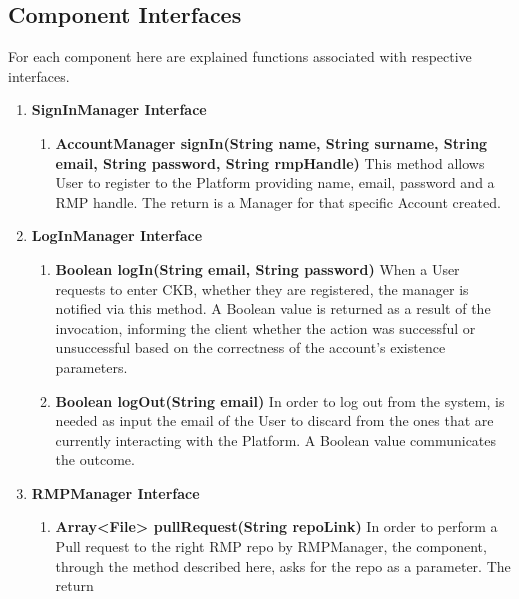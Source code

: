 \subsection{Component Interfaces}
For each component here are explained functions associated with respective interfaces.
\begin{enumerate}
    \item \textbf{SignInManager Interface} 
            \begin{enumerate}[label=$\bullet$]
                \item \textbf{AccountManager signIn(String name, String surname, String email, String password, String rmpHandle)} This method allows User to register to the Platform providing name, email, password and a RMP handle. 
                The return is a Manager for that specific Account created.
            \end{enumerate}
    \item \textbf{LogInManager Interface}
        \begin{enumerate}[label=$\bullet$]
            \item \textbf{Boolean logIn(String email, String password)} When a User requests to enter CKB, whether they are registered, the manager is notified via this method. A Boolean value is returned as a result of the 
            invocation, informing the client whether the action was successful or unsuccessful based on the correctness of the account's existence parameters.
            \item \textbf{Boolean logOut(String email)} In order to log out from the system, is needed as input the email of the User to discard from the ones that are currently interacting with the Platform. A Boolean value communicates 
            the outcome.
        \end{enumerate}
    \item \textbf{RMPManager Interface}
        \begin{enumerate}[label=$\bullet$]
            \item \textbf{Array<File> pullRequest(String repoLink)} In order to perform a Pull request to the right RMP repo by RMPManager, the component, through the method described here, asks for the repo as a parameter. The return 

\end{enumerate}
\end{enumerate}
